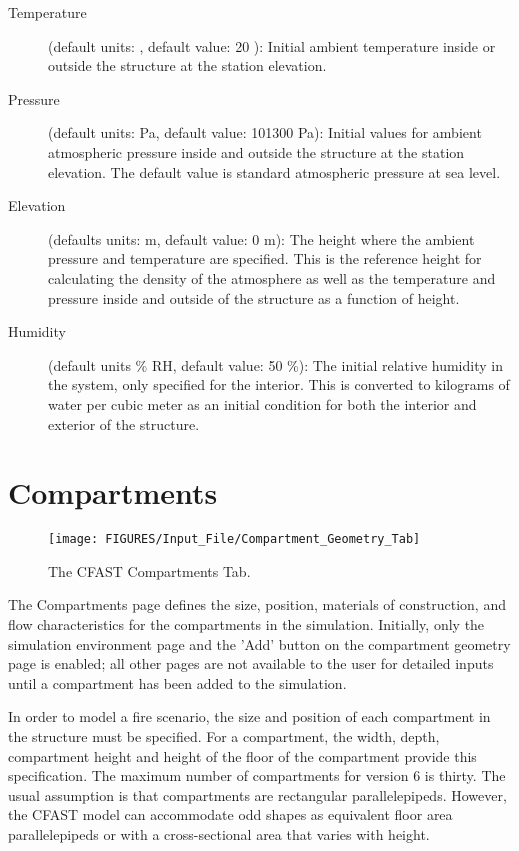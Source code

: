 \begin{description}
\item[Temperature] (default units: \degc, default value: 20 \degc): Initial ambient temperature inside or outside the structure at the station elevation.

\item[Pressure] (default units: Pa, default value: 101300 Pa): Initial values for ambient atmospheric pressure inside and outside the structure at the station elevation. The default value is standard atmospheric pressure at sea level.

\item[Elevation] (defaults units: m, default value: 0 m): The height where the ambient pressure and temperature are specified.  This is the reference height for calculating the density of the atmosphere as well as the temperature and pressure inside and outside of the structure as a function of height.

\item[Humidity] (default units \% RH, default value: 50 \%): The initial relative humidity in the system, only specified for the interior.  This is converted to kilograms of water per cubic meter as an initial condition for both the interior and exterior of the structure.
\end{description}






\chapter{Compartments}

\begin{figure}[h!]
\begin{center}
\texttt{[image: FIGURES/Input\_File/Compartment\_Geometry\_Tab]}
\caption[The CFAST Compartments Tab]{The CFAST Compartments Tab.}
\end{center}
\end{figure}

The Compartments page defines the size, position, materials of construction, and flow characteristics for the compartments in the simulation. Initially, only the simulation environment page and the 'Add' button on the compartment geometry page is enabled; all other pages are not available to the user for detailed inputs until a compartment has been added to the simulation.

In order to model a fire scenario, the size and position of each compartment in the structure must be specified. For a compartment, the width, depth, compartment height and height of the floor of the compartment provide this specification. The maximum number of compartments for version 6 is thirty. The usual assumption is that compartments are rectangular parallelepipeds. However, the CFAST model can accommodate odd shapes as equivalent floor area parallelepipeds or with a cross-sectional area that varies with height.

